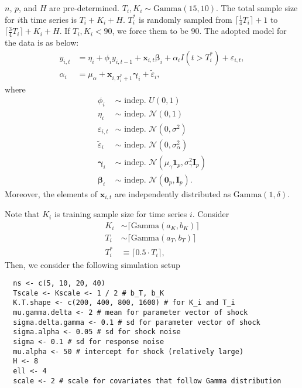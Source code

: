 \documentclass[12pt]{article}
\def\mbf#1{\mathbf{#1}} %
\def\mrm#1{\mathrm{#1}} %
\def\mc#1{\mathcal{#1}} %
\def\mc#1{\mathcal{#1}}
\def\bs#1{\boldsymbol{#1}}
\newcommand{\ceil}[1]{\lceil #1 \rceil}
\theoremstyle{definition}
\theoremstyle{definition}
\begin{document}
$n$, $p$, and $H$ are pre-determined. $T_i, K_i \sim \mrm{Gamma}(15, 10)$.  The total sample size for $i$th time series is $T_i + K_i + H$. $T_i^*$ is randomly sampled from $\ceil{\frac{1}{4}T_i}+1$ to $\ceil{\frac{3}{4} T_i} + K_i+ H$. If $T_i, K_i < 90$, we force them to be 90. The adopted model for the data is as below:
\begin{align*}
  y_{i,t} &= \eta_i + \phi_i y_{i,t-1} + \mbf{x}_{i,t} \bs{\beta}_i + \alpha_i I(t > T_i^*) + \varepsilon_{i,t},\\
  \alpha_i &= \mu_{\alpha} + \mbf{x}_{i,T_i^*+1}\bs{\gamma}_i + \tilde{\varepsilon}_{i},
\end{align*}
where
\begin{align*}
  \phi_i & \sim \text{ indep. }  U(0,1) \\
  \eta_i & \sim \text{ indep. }  \mc{N}(0,1) \\
  \varepsilon_{i,t} & \sim \text{ indep. } \mc{N}(0, \sigma^2)\\
  \tilde{\varepsilon}_i & \sim \text{ indep. } \mc{N}(0, \sigma_{\alpha}^2)
  \\
  \bs{\gamma}_i & \sim \text{ indep. } \mc{N}(\mu_{\gamma}\bs{1}_p, \sigma_{\gamma}^2 \mbf{I}_p) \\
  \bs{\beta}_i & \sim \text{ indep. }  \mc{N}(\bs{0}_p, \mbf{I}_p).
\end{align*}
Moreover, the elements of $\mathbf{x}_{i,t}$ are independently distributed as $\mrm{Gamma}(1,\delta)$.

Note that $K_i$ is training sample size for time series $i$. Consider
\begin{align*}
  K_i & \sim \ceil{\mrm{Gamma}(a_{K}, b_K)}\\
   T_i & \sim \ceil{\mrm{Gamma}(a_{T}, b_T)} \\
  T_i^* &\equiv \ceil{0.5 \cdot T_i},
\end{align*}
 Then, we consider the following simulation setup
\begin{verbatim}
  ns <- c(5, 10, 20, 40)
  Tscale <- Kscale <- 1 / 2 # b_T, b_K 
  K.T.shape <- c(200, 400, 800, 1600) # for K_i and T_i
  mu.gamma.delta <- 2 # mean for parameter vector of shock
  sigma.delta.gamma <- 0.1 # sd for parameter vector of shock
  sigma.alpha <- 0.05 # sd for shock noise  
  sigma <- 0.1 # sd for response noise
  mu.alpha <- 50 # intercept for shock (relatively large)
  H <- 8 
  ell <- 4
  scale <- 2 # scale for covariates that follow Gamma distribution
\end{verbatim}
\end{document}
